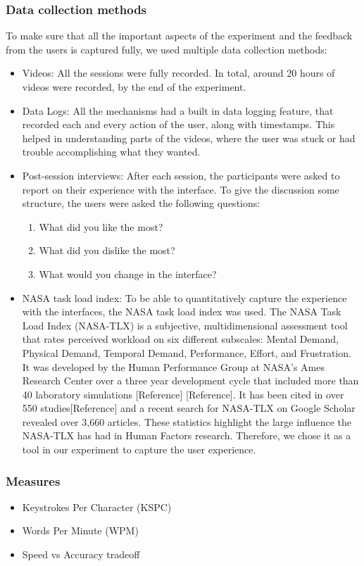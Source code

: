 \subsubsection{Data collection methods}
To make sure that all the important aspects of the experiment and the feedback from the users is captured fully, we used multiple data collection methods:
\begin{itemize}
	\item Videos: All the sessions were fully recorded. In total, around 20 hours of videos were recorded, by the end of the experiment. 
 	\item Data Logs: All the mechanisms had a built in data logging feature, that recorded each and every action of the user, along with timestamps. This helped in understanding parts of the videos, where the user was stuck or had trouble accomplishing what they wanted.
	\item Post-session interviews: After each session, the participants were asked to report on their experience with the interface. To give the discussion some structure, the users were asked the following questions:
\begin{enumerate}
	\item What did you like the most?
	\item What did you dislike the most?
	\item What would you change in the interface?
\end{enumerate}
	\item NASA task load index: To be able to quantitatively capture the experience with the interfaces, the NASA task load index was used. The NASA Task Load Index (NASA-TLX) is a subjective, multidimensional assessment tool that rates perceived workload on six different subscales: Mental Demand, Physical Demand, Temporal Demand, Performance, Effort, and Frustration. It was developed by the Human Performance Group at NASA's Ames Research Center over a three year development cycle that included more than 40 laboratory simulations [Reference] [Reference]. It has been cited in over 550 studies[Reference] and a recent search for NASA-TLX on Google Scholar revealed over 3,660 articles. These statistics highlight the large influence the NASA-TLX has had in Human Factors research. Therefore, we chose it as a tool in our experiment to capture the user experience. 
\end{itemize}
\subsubsection{Measures}
\begin{itemize}
	\item Keystrokes Per Character (KSPC)
	\item Words Per Minute (WPM)
	\item Speed vs Accuracy tradeoff 
\end{itemize}
